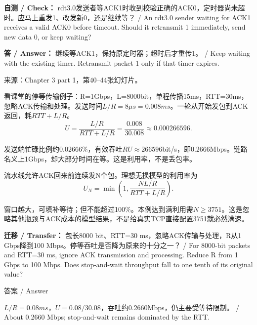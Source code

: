 



\textbf{自测 / Check：} rdt3.0发送者等ACK1时收到校验正确的ACK0，定时器尚未超时。应马上重发1、改发新0，还是继续等？ / An rdt3.0 sender waiting for ACK1 receives a valid ACK0 before timeout. Should it retransmit 1 immediately, send new data 0, or keep waiting?


\textbf{答 / Answer：} 继续等ACK1，保持原定时器；超时后才重传1。 / Keep waiting with the existing timer. Retransmit packet 1 only if that timer expires.


来源：Chapter 3 part 1，第40–44张幻灯片。








看课堂的停等传输例子：R=1Gbps，L=8000bit，单程传播15ms，RTT=30ms，忽略ACK传输和处理。发送时间\(L/R=8\mu s=0.008ms\)。一轮从开始发包到ACK返回，耗\(RTT+L/R\)。
\[
U=\frac{L/R}{RTT+L/R}=\frac{0.008}{30.008}\approx0.000266596.\tag{3.1}
\]


发送端忙碌比例约0.02666\%，有效吞吐\(RU\approx266596\)bit/s，即0.2666Mbps。链路名义上1Gbps，却大部分时间在等。这是利用率，不是丢包率。


流水线允许ACK回来前连续发N个包。理想无损模型的利用率为
\[
U_N=\min\left(1,\frac{N L/R}{RTT+L/R}\right).\tag{3.2}
\]


窗口越大，可填补等待；但不能超过100\%。本例达到满利用需\(N\ge3751\)。这是忽略其他瓶颈与ACK成本的模型结果，不是给真实TCP直接配置3751就必然满速。


\textbf{迁移 / Transfer：} 包长8000 bit、RTT=30 ms，忽略ACK传输与处理，R从1 Gbps降到100 Mbps。停等吞吐是否降为原来的十分之一？ / For 8000-bit packets and RTT=30 ms, ignore ACK transmission and processing. Reduce R from 1 Gbps to 100 Mbps. Does stop-and-wait throughput fall to one tenth of its original value?



\begin{StudySolution}{答案 / Answer}


\(L/R=0.08ms\)，\(U=0.08/30.08\)，吞吐约0.2660Mbps，仍主要受等待限制。 / About 0.2660 Mbps; stop-and-wait remains dominated by the RTT.


\end{StudySolution}



